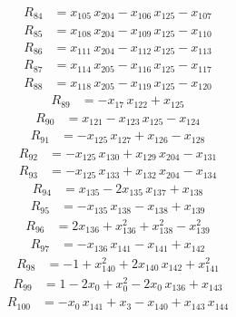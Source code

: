\begin{align*}
R_{84} &= x_{105}\,x_{204} -x_{106}\,x_{125} -x_{107}
\end{align*}
\begin{align*}
R_{85} &= x_{108}\,x_{204} -x_{109}\,x_{125} -x_{110}
\end{align*}
\begin{align*}
R_{86} &= x_{111}\,x_{204} -x_{112}\,x_{125} -x_{113}
\end{align*}
\begin{align*}
R_{87} &= x_{114}\,x_{205} -x_{116}\,x_{125} -x_{117}
\end{align*}
\begin{align*}
R_{88} &= x_{118}\,x_{205} -x_{119}\,x_{125} -x_{120}
\end{align*}
\begin{align*}
R_{89} &= -x_{17}\,x_{122} +x_{125}
\end{align*}
\begin{align*}
R_{90} &= x_{121} -x_{123}\,x_{125} -x_{124}
\end{align*}
\begin{align*}
R_{91} &= -x_{125}\,x_{127} +x_{126} -x_{128}
\end{align*}
\begin{align*}
R_{92} &= -x_{125}\,x_{130} +x_{129}\,x_{204} -x_{131}
\end{align*}
\begin{align*}
R_{93} &= -x_{125}\,x_{133} +x_{132}\,x_{204} -x_{134}
\end{align*}
\begin{align*}
R_{94} &= x_{135} -2x_{135}\,x_{137} +x_{138}
\end{align*}
\begin{align*}
R_{95} &= -x_{135}\,x_{138} -x_{138} +x_{139}
\end{align*}
\begin{align*}
R_{96} &= 2x_{136} +x_{136}^{2} +x_{138}^{2} -x_{139}^{2}
\end{align*}
\begin{align*}
R_{97} &= -x_{136}\,x_{141} -x_{141} +x_{142}
\end{align*}
\begin{align*}
R_{98} &= -1 +x_{140}^{2} +2x_{140}\,x_{142} +x_{141}^{2}
\end{align*}
\begin{align*}
R_{99} &= 1 -2x_{0} +x_{0}^{2} -2x_{0}\,x_{136} +x_{143}
\end{align*}
\begin{align*}
R_{100} &= -x_{0}\,x_{141} +x_{3} -x_{140} +x_{143}\,x_{144}
\end{align*}
